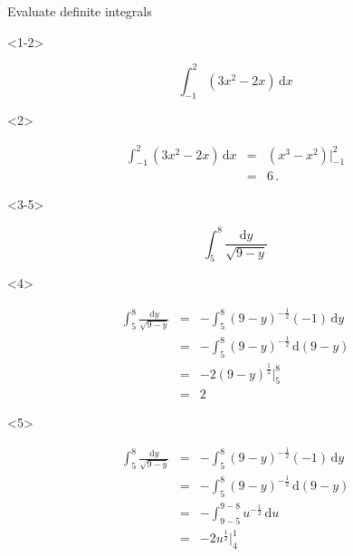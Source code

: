 \begin{frame}{Evaluate definite integrals}

\begin{onlyenv}<1-2>

\begin{example}
\[
\int_{-1}^{2}\left(3x^{2}-2x\right)\,\mathrm{d}x
\]
\end{example}

\begin{uncoverenv}<2>

\begin{sol}
\begin{eqnarray*}
\int_{-1}^{2}\left(3x^{2}-2x\right)\,\mathrm{d}x & = & \left(x^{3}-x^{2}\right)\big|_{-1}^{2}\\
 & = & 6\,.
\end{eqnarray*}

\end{sol}
\end{uncoverenv}

\end{onlyenv}



\begin{onlyenv}<3-5>

\begin{example}
\[
\int_{5}^{8}\frac{\mathrm{d}y}{\sqrt{9-y}}
\]
\end{example}

\begin{onlyenv}<4>

\begin{sol}
{\scriptsize{}
\begin{eqnarray*}
\int_{5}^{8}\frac{\mathrm{d}y}{\sqrt{9-y}} & = & -\int_{5}^{8}\left(9-y\right)^{-\frac{1}{2}}\left(-1\right)\,\mathrm{d}y\\
 & = & -\int_{5}^{8}\left(9-y\right)^{-\frac{1}{2}}\,\mathrm{d}\left(9-y\right)\\
 & = & -2\left(9-y\right)^{\frac{1}{2}}\bigg|_{5}^{8}\\
 & = & 2
\end{eqnarray*}
}{\scriptsize \par}
\end{sol}
\end{onlyenv}



\begin{onlyenv}<5>

\begin{sol}
{\scriptsize{}
\begin{eqnarray*}
\int_{5}^{8}\frac{\mathrm{d}y}{\sqrt{9-y}} & = & -\int_{5}^{8}\left(9-y\right)^{-\frac{1}{2}}\left(-1\right)\,\mathrm{d}y\\
 & = & -\int_{5}^{8}\left(9-y\right)^{-\frac{1}{2}}\,\mathrm{d}\left(9-y\right)\\
 & = & -\int_{9-5}^{9-8}u^{-\frac{1}{2}}\,\mathrm{d}u\\
 & = & -2u^{\frac{1}{2}}\bigg|_{4}^{1}
\end{eqnarray*}
}{\scriptsize \par}
\end{sol}
\end{onlyenv}


\end{onlyenv}
\end{frame}

